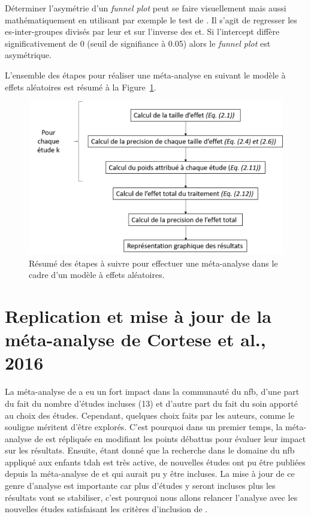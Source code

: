 Déterminer l'asymétrie d'un \textit{funnel plot} peut se faire visuellement mais aussi mathématiquement en utilisant par exemple le test de \citet{Egger1997}. 
Il s'agit de regresser les \gls{es}-inter-groupes divisés par leur \gls{et} sur l'inverse des \gls{et}. Si l'intercept diffère significativement de 
0 (seuil de signifiance à 0.05) alors le \textit{funnel plot} est asymétrique.

L'ensemble des étapes pour réaliser une méta-analyse en suivant le modèle à effets aléatoires est résumé à la Figure~\ref{Figure:pipeline_meta_analyse}.

\begin{figure}[h!]
  \centering
	\includegraphics[width=1.0\linewidth]{figures/chapter-2/pipeline-perform-meta-analysis} 
  \caption{Résumé des étapes à suivre pour effectuer une méta-analyse dans le cadre d'un modèle à effets aléatoires.}
  \label{Figure:pipeline_meta_analyse}
\end{figure}

\section{Replication et mise à jour de la méta-analyse de Cortese et al., 2016} \label{replication_and_update}

La méta-analyse de \citet{Cortese2016} a eu un fort impact dans la communauté du \gls{nfb}, d'une part du fait du nombre d'études incluses (13) et d'autre part
du fait du soin apporté au choix des études. Cependant, quelques choix faits par les auteurs, comme le souligne \citet{Micoulaud2016} méritent d'être explorés.
C'est pourquoi dans un premier temps, la méta-analyse de \citet{Cortese2016} est répliquée en modifiant les points débattus pour évaluer leur impact sur les
résultats. Ensuite, étant donné que la recherche dans le domaine du \gls{nfb} appliqué aux enfants \gls{tdah} est très active, de nouvelles études ont pu
être publiées depuis la méta-analyse de \citet{Cortese2016} et qui aurait pu y être incluses. La mise à jour de ce genre d'analyse est importante
car plus d'études y seront incluses plus les résultats vont se stabiliser, c'est pourquoi nous allons relancer l'analyse avec les nouvelles études
satisfaisant les critères d'inclusion de \citet{Cortese2016}.


